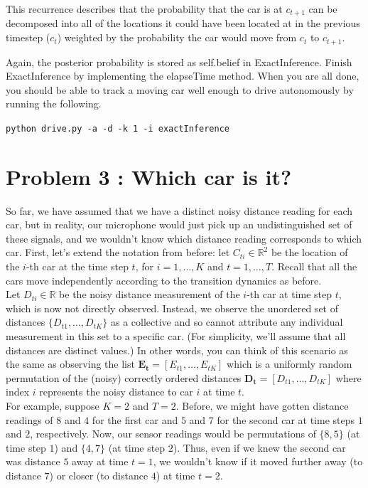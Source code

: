 \documentclass{article}
\theoremstyle{case}
\theoremstyle{definition}
\begin{document}
\begin{enumerate}
     This recurrence describes that the probability that the car is at $c_{t+1}$ can be decomposed into all of the locations it could have been located at in the previous timestep ($c_{t}$) weighted by the probability the car would move from $c_{t}$ to $c_{t+1}$.
     
     Again, the posterior probability is stored as self.belief in ExactInference. Finish ExactInference by implementing the elapseTime method. When you are all done, you should be able to track a moving car well enough to drive autonomously by running the following.

     \texttt{python drive.py -a -d -k 1 -i exactInference}
    
\end{enumerate}
\section*{Problem 3 : Which car is it?}


So far, we have assumed that we have a distinct noisy distance reading for each car, but in
reality, our microphone would just pick up an undistinguished set of these signals, and we
wouldn't know which distance reading corresponds to which car.
First, let's extend the notation from before: let $C_{ti} \in \mathbb R^2$ be the location
of the $i$-th car at the time step $t$, for $i = 1, \dots, K$ and $t = 1, \dots, T$.
Recall that all the cars move independently according to the transition dynamics as before.\\


Let $D_{ti} \in \mathbb R$ be the noisy distance measurement of the $i$-th car at time step $t$,
which is now not directly observed.
Instead, we observe the unordered set of distances
$\{ D_{t1}, \dots, D_{tK} \}$ as a collective and so cannot attribute any individual measurement in this set to a specific car.  (For simplicity, we'll assume that all distances are distinct values.)
In other words, you can think of this scenario as the same as observing the list $\mathbf{E_t} = [E_{t1}, \dots, E_{tK}]$
which is a uniformly random permutation of the (noisy) correctly ordered distances $\mathbf{D_t} = [D_{t1}, \dots, D_{tK}]$ where index $i$ represents the noisy distance to car $i$ at time $t$.\\

For example, suppose $K=2$ and $T = 2$.
Before, we might have gotten distance readings of $8$ and $4$ for the first car and
$5$ and $7$ for the second car at time steps $1$ and $2$, respectively.
Now, our sensor readings would be permutations of $\{8, 5\}$ (at time step $1$) and $\{4, 7\}$ (at time step $2$).
Thus, even if we knew the second car was distance $5$ away at time $t = 1$,
we wouldn't know if it moved further away (to distance $7$) or closer (to distance $4$) at time $t = 2$.\\
\end{document}
